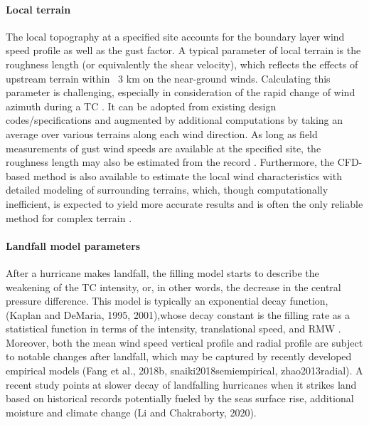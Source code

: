 \paragraph{Local terrain} The local topography at a specified site accounts for the boundary layer wind speed profile as well as the gust factor. A typical parameter of local terrain is the roughness length (or equivalently the shear velocity), which reflects the effects of upstream terrain within ~3 km on the near-ground winds. Calculating this parameter is challenging, especially in consideration of the rapid change of wind azimuth during a TC \citep{vickery2009hurricane-a}. It can be adopted from existing design codes/specifications and augmented by additional computations by taking an average over various terrains along each wind direction. As long as field measurements of gust wind speeds are available at the specified site, the roughness length may also be estimated from the record \citep{masters2010objective}. Furthermore, the CFD-based method is also available to estimate the local wind characteristics with detailed modeling of surrounding terrains, which, though computationally inefficient, is expected to yield more accurate results and is often the only reliable method for complex terrain \citep{huang2013prediction,ishihara2005wind}. 

\paragraph{Landfall model parameters} After a hurricane makes landfall, the filling model starts to describe the weakening of the TC intensity, or, in other words, the decrease in the central pressure difference. This model is typically an exponential decay function, (Kaplan and DeMaria, 1995, 2001),whose decay constant is the filling rate as a statistical function in terms of the intensity, translational speed, and RMW \citep{vickery1995windfield, vickery2005simple, vickery2009hurricane-b}. Moreover, both the mean wind speed vertical profile and radial profile are subject to notable changes after landfall, which may be captured by recently developed empirical models (Fang et al., 2018b, snaiki2018semiempirical, zhao2013radial). A recent study points at slower decay of landfalling hurricanes when it strikes land based on historical records potentially fueled by the seas surface rise, additional moisture and climate change (Li and Chakraborty, 2020). 

